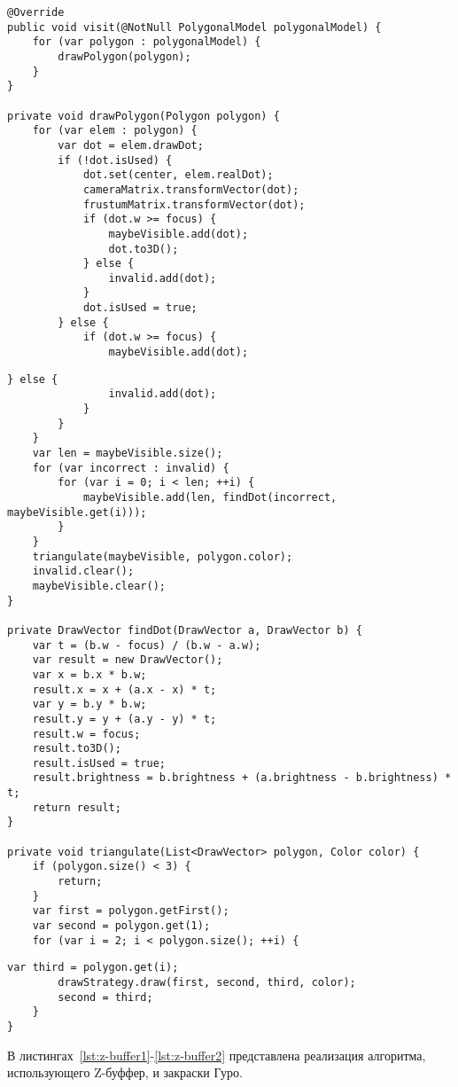 \begin{lstlisting}[label=lst:cut1,caption=Реализация алгоритма подготовки полигонов к отрисовке (начало)]
@Override
public void visit(@NotNull PolygonalModel polygonalModel) {
	for (var polygon : polygonalModel) {
		drawPolygon(polygon);
	}
}

private void drawPolygon(Polygon polygon) {
	for (var elem : polygon) {
		var dot = elem.drawDot;
		if (!dot.isUsed) {
			dot.set(center, elem.realDot);
			cameraMatrix.transformVector(dot);
			frustumMatrix.transformVector(dot);
			if (dot.w >= focus) {
				maybeVisible.add(dot);
				dot.to3D();
			} else {
				invalid.add(dot);
			}
			dot.isUsed = true;
		} else {
			if (dot.w >= focus) {
				maybeVisible.add(dot);
\end{lstlisting}
\begin{lstlisting}[label=lst:cut2,caption=Реализация алгоритма подготовки полигонов к отрисовке (продолжение)]
			} else {
				invalid.add(dot);
			}
		}
	}
	var len = maybeVisible.size();
	for (var incorrect : invalid) {
		for (var i = 0; i < len; ++i) {
			maybeVisible.add(len, findDot(incorrect, maybeVisible.get(i)));
		}
	}
	triangulate(maybeVisible, polygon.color);
	invalid.clear();
	maybeVisible.clear();
}

private DrawVector findDot(DrawVector a, DrawVector b) {
	var t = (b.w - focus) / (b.w - a.w);
	var result = new DrawVector();
	var x = b.x * b.w;
	result.x = x + (a.x - x) * t;
	var y = b.y * b.w;
	result.y = y + (a.y - y) * t;
	result.w = focus;
	result.to3D();
	result.isUsed = true;
	result.brightness = b.brightness + (a.brightness - b.brightness) * t;
	return result;
}

private void triangulate(List<DrawVector> polygon, Color color) {
	if (polygon.size() < 3) {
		return;
	}
	var first = polygon.getFirst();
	var second = polygon.get(1);
	for (var i = 2; i < polygon.size(); ++i) {
\end{lstlisting}
\begin{lstlisting}[label=lst:cut3,caption=Реализация алгоритма подготовки полигонов к отрисовке (окончание)]
		var third = polygon.get(i);
		drawStrategy.draw(first, second, third, color);
		second = third;
	}
}
\end{lstlisting}

В листингах~\ref{lst:z-buffer1}-\ref{lst:z-buffer2} представлена реализация алгоритма, использующего Z-буффер, и закраски Гуро.

